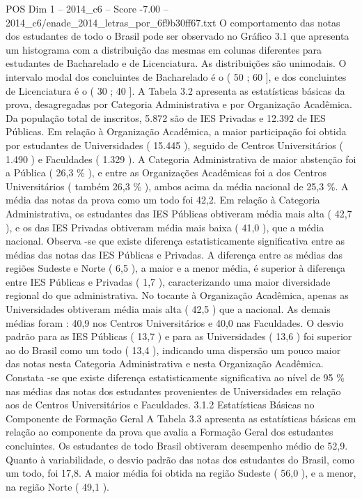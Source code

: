 \begin{textsample}{POS Dim 1 – 2014\_c6 – Score -7.00 – 2014\_c6/enade\_2014\_letras\_por\_6f9b30ff67.txt}
O comportamento das notas dos estudantes de todo o Brasil pode ser observado no Gráfico 3.1 que apresenta um histograma com a distribuição das mesmas em colunas diferentes para estudantes de Bacharelado e de Licenciatura.
As distribuições são unimodais.
O intervalo modal dos concluintes de Bacharelado é o ( 50 ; 60 ], e dos concluintes de Licenciatura é o ( 30 ; 40 ].
A Tabela 3.2 apresenta as estatísticas básicas da prova, desagregadas por Categoria Administrativa e por Organização Acadêmica.
Da população total de inscritos, 5.872 são de IES Privadas e 12.392 de IES Públicas.
Em relação à Organização Acadêmica, a maior participação foi obtida por estudantes de Universidades ( 15.445 ), seguido de Centros Universitários ( 1.490 ) e Faculdades ( 1.329 ).
A Categoria Administrativa de maior abstenção foi a Pública ( 26,3 \% ), e entre as Organizações Acadêmicas foi a dos Centros Universitários ( também 26,3 \% ), ambos acima da média nacional de 25,3 \%.
A média das notas da prova como um todo foi 42,2.
Em relação à Categoria Administrativa, os estudantes das IES Públicas obtiveram média mais alta ( 42,7 ), e os das IES Privadas obtiveram média mais baixa ( 41,0 ), que a média nacional.
Observa -se que existe diferença estatisticamente significativa entre as médias das notas das IES Públicas e Privadas.
A diferença entre as médias das regiões Sudeste e Norte ( 6,5 ), a maior e a menor média, é superior à diferença entre IES Públicas e Privadas ( 1,7 ), caracterizando uma maior diversidade regional do que administrativa.
No tocante à Organização Acadêmica, apenas as Universidades obtiveram média mais alta ( 42,5 ) que a nacional.
As demais médias foram : 40,9 nos Centros Universitários e 40,0 nas Faculdades.
O desvio padrão para as IES Públicas ( 13,7 ) e para as Universidades ( 13,6 ) foi superior ao do Brasil como um todo ( 13,4 ), indicando uma dispersão um pouco maior das notas nesta Categoria Administrativa e nesta Organização Acadêmica.
Constata -se que existe diferença estatisticamente significativa ao nível de 95 \% nas médias das notas dos estudantes provenientes de Universidades em relação aos de Centros Universitários e Faculdades. 3.1.2 Estatísticas Básicas no Componente de Formação Geral A Tabela 3.3 apresenta as estatísticas básicas em relação ao componente da prova que avalia a Formação Geral dos estudantes concluintes.
Os estudantes de todo Brasil obtiveram desempenho médio de 52,9.
Quanto à variabilidade, o desvio padrão das notas dos estudantes do Brasil, como um todo, foi 17,8.
A maior média foi obtida na região Sudeste ( 56,0 ), e a menor, na região Norte ( 49,1 ).

\end{textsample}
